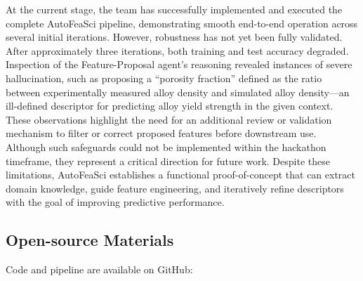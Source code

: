 At the current stage, the team has successfully implemented and executed the complete AutoFeaSci pipeline, demonstrating smooth end-to-end operation across several initial iterations. However, robustness has not yet been fully validated. After approximately three iterations, both training and test accuracy degraded. Inspection of the Feature-Proposal agent’s reasoning revealed instances of severe hallucination, such as proposing a “porosity fraction” defined as the ratio between experimentally measured alloy density and simulated alloy density—an ill-defined descriptor for predicting alloy yield strength in the given context. These observations highlight the need for an additional review or validation mechanism to filter or correct proposed features before downstream use. Although such safeguards could not be implemented within the hackathon timeframe, they represent a critical direction for future work. Despite these limitations, AutoFeaSci establishes a functional proof-of-concept that can extract domain knowledge, guide feature engineering, and iteratively refine descriptors with the goal of improving predictive performance.


\subsection*{Open-source Materials}
Code and pipeline are available on GitHub: 








